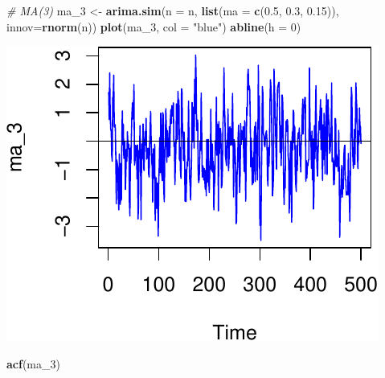 \documentclass[11pt,]{article}
\newenvironment{Shaded}{\begin{snugshade}}{\end{snugshade}}
\newcommand{\KeywordTok}[1]{\textcolor[rgb]{0.13,0.29,0.53}{\textbf{#1}}}
\newcommand{\DataTypeTok}[1]{\textcolor[rgb]{0.13,0.29,0.53}{#1}}
\newcommand{\DecValTok}[1]{\textcolor[rgb]{0.00,0.00,0.81}{#1}}
\newcommand{\FloatTok}[1]{\textcolor[rgb]{0.00,0.00,0.81}{#1}}
\newcommand{\StringTok}[1]{\textcolor[rgb]{0.31,0.60,0.02}{#1}}
\newcommand{\CommentTok}[1]{\textcolor[rgb]{0.56,0.35,0.01}{\textit{#1}}}
\newcommand{\NormalTok}[1]{#1}
\begin{document}
\begin{Shaded}
\begin{Highlighting}[]
\CommentTok{# MA(3)}
\NormalTok{ma_}\DecValTok{3}\NormalTok{ <-}\StringTok{ }\KeywordTok{arima.sim}\NormalTok{(}\DataTypeTok{n =}\NormalTok{ n, }\KeywordTok{list}\NormalTok{(}\DataTypeTok{ma =} \KeywordTok{c}\NormalTok{(}\FloatTok{0.5}\NormalTok{, }\FloatTok{0.3}\NormalTok{, }\FloatTok{0.15}\NormalTok{)), }\DataTypeTok{innov=}\KeywordTok{rnorm}\NormalTok{(n))}
\KeywordTok{plot}\NormalTok{(ma_}\DecValTok{3}\NormalTok{, }\DataTypeTok{col =} \StringTok{"blue"}\NormalTok{)}
\KeywordTok{abline}\NormalTok{(}\DataTypeTok{h =} \DecValTok{0}\NormalTok{)}
\end{Highlighting}
\end{Shaded}

\begin{center}\includegraphics{FMC_T4_PhD_ARMA_GARCH_files/figure-latex/MA-6} \end{center}

\begin{Shaded}
\begin{Highlighting}[]
\KeywordTok{acf}\NormalTok{(ma_}\DecValTok{3}\NormalTok{)}
\end{Highlighting}
\end{Shaded}
\end{document}
